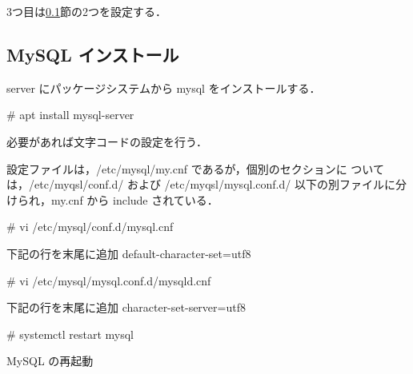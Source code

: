 3つ目は\ref{char-sql}節の2つを設定する．





\subsection{MySQL インストール}
\label{char-sql}

server にパッケージシステムから mysql をインストールする．

\begin{cli}
# apt install mysql-server
\end{cli}

必要があれば文字コードの設定を行う．

\begin{cli}
  設定ファイルは，/etc/mysql/my.cnf であるが，個別のセクションに
  ついては，/etc/myqsl/conf.d/ および /etc/myqsl/mysql.conf.d/
  以下の別ファイルに分けられ，my.cnf から include されている．

# vi /etc/mysql/conf.d/mysql.cnf

  下記の行を末尾に追加
  default-character-set=utf8

# vi /etc/mysql/mysql.conf.d/mysqld.cnf

  下記の行を末尾に追加
  character-set-server=utf8

# systemctl restart mysql

  MySQL の再起動
\end{cli}

